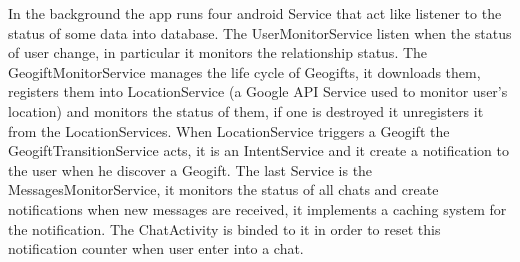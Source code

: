 In the background the app runs four android Service that act like listener to the status of some data into database. 
The UserMonitorService listen when the status of user change, in particular it monitors the relationship status. 
The GeogiftMonitorService manages the life cycle of Geogifts, it downloads them, registers them into LocationService (a Google API Service used to monitor user's location) and monitors the status of them, if one is destroyed it unregisters it from the LocationServices. When LocationService triggers a Geogift the GeogiftTransitionService acts, it is an IntentService and it create a notification to the user when he discover a Geogift. 
The last Service is the MessagesMonitorService, it monitors the status of all chats and create notifications when new messages are received, it implements a caching system for the notification. The ChatActivity is binded to it in order to reset this notification counter when user enter into a chat.
